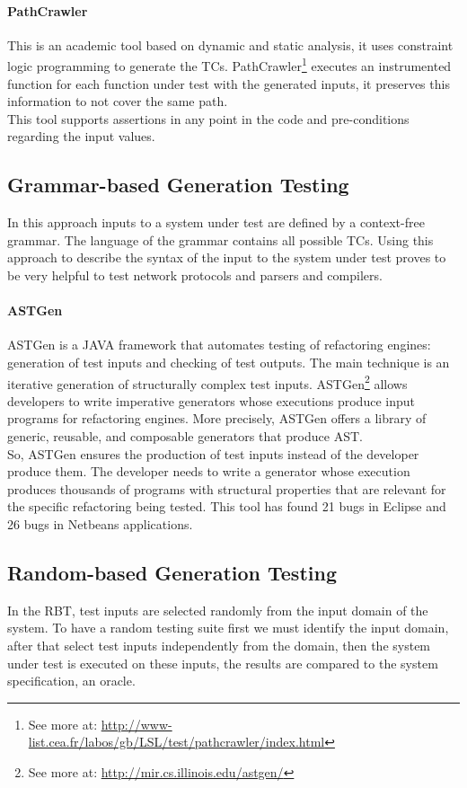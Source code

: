 \paragraph{PathCrawler} This is an academic tool based on dynamic and static analysis\cite{Williams05pathcrawler:automatic}, 
it uses constraint logic programming to generate the \ac{TC}s. PathCrawler\footnote{See more at: \url{http://www-list.cea.fr/labos/gb/LSL/test/pathcrawler/index.html}} executes an instrumented function for each function under test
with the generated inputs, it preserves this information to not cover the same path.\\
This tool supports assertions in any point in the code and pre-conditions regarding the input values.

\subsection{Grammar-based Generation Testing}
In this approach inputs to a system under test are defined by a context-free grammar. The language of the grammar contains all possible \ac{TC}s.
Using this approach to describe the syntax of the input to the system under test proves to be very helpful to test
network protocols\cite{tal:syntax-based,kaksonen2001functional} and parsers and compilers\cite{1994-burgess,Burgess_Saidi_1996}.

\paragraph{ASTGen}
ASTGen\cite{Daniel:2007:ATR:1287624.1287651} is a JAVA framework that automates testing of refactoring engines: generation of test inputs
and checking of test outputs. The main technique is an iterative generation of structurally complex test inputs.
ASTGen\footnote{See more at: \url{http://mir.cs.illinois.edu/astgen/}} allows developers to write imperative generators whose executions
produce input programs for refactoring engines. More precisely, ASTGen
offers a library of generic, reusable, and composable generators that produce \ac{AST}.\\
So, ASTGen ensures the production of test inputs instead of the developer produce them. The developer needs to write a generator whose execution
produces thousands of programs with structural properties that are relevant for the specific refactoring being tested. This tool has found
21 bugs in Eclipse and 26 bugs in Netbeans applications.

\subsection{Random-based Generation Testing}
In the \ac{RBT}, test inputs are selected randomly from the input domain of the system.
To have a random testing suite first we must identify the input domain, after that select test inputs independently from the domain,
then the system under test is executed on these inputs, the results are compared to the system specification, an oracle.

